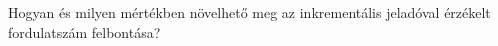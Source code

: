 \begin{example}

Hogyan és milyen mértékben növelhető meg az inkrementális jeladóval érzékelt fordulatszám felbontása?

\tcbline
\vspace{1mm}

\solution

\end{example}